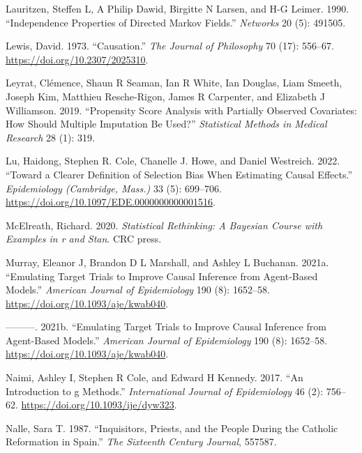 \documentclass[
  singlecolumn]{article}
\newlength{\cslhangindent}
\newlength{\cslentryspacingunit} %
\newenvironment{CSLReferences}[2] %
 {%
  \setlength{\parindent}{0pt}
  \ifodd #1
  \let\oldpar\par
  \def\par{\hangindent=\cslhangindent\oldpar}
  \fi
  \setlength{\parskip}{#2\cslentryspacingunit}
 }%
 {}
\begin{document}
\begin{CSLReferences}{1}{0}
\leavevmode{}%
Lauritzen, Steffen L, A Philip Dawid, Birgitte N Larsen, and H-G Leimer.
1990. {``Independence Properties of Directed Markov Fields.''}
\emph{Networks} 20 (5): 491505.

\leavevmode{}%
Lewis, David. 1973. {``Causation.''} \emph{The Journal of Philosophy} 70
(17): 556--67. \url{https://doi.org/10.2307/2025310}.

\leavevmode{}%
Leyrat, Clémence, Shaun R Seaman, Ian R White, Ian Douglas, Liam Smeeth,
Joseph Kim, Matthieu Resche-Rigon, James R Carpenter, and Elizabeth J
Williamson. 2019. {``Propensity Score Analysis with Partially Observed
Covariates: How Should Multiple Imputation Be Used?''} \emph{Statistical
Methods in Medical Research} 28 (1): 319.

\leavevmode{}%
Lu, Haidong, Stephen R. Cole, Chanelle J. Howe, and Daniel Westreich.
2022. {``Toward a Clearer Definition of Selection Bias When Estimating
Causal Effects.''} \emph{Epidemiology (Cambridge, Mass.)} 33 (5):
699--706. \url{https://doi.org/10.1097/EDE.0000000000001516}.

\leavevmode{}%
McElreath, Richard. 2020. \emph{Statistical Rethinking: A Bayesian
Course with Examples in r and Stan}. CRC press.

\leavevmode{}%
Murray, Eleanor J, Brandon D L Marshall, and Ashley L Buchanan. 2021a.
{``Emulating Target Trials to Improve Causal Inference from Agent-Based
Models.''} \emph{American Journal of Epidemiology} 190 (8): 1652--58.
\url{https://doi.org/10.1093/aje/kwab040}.

\leavevmode{}%
---------. 2021b. {``Emulating Target Trials to Improve Causal Inference
from Agent-Based Models.''} \emph{American Journal of Epidemiology} 190
(8): 1652--58. \url{https://doi.org/10.1093/aje/kwab040}.

\leavevmode{}%
Naimi, Ashley I, Stephen R Cole, and Edward H Kennedy. 2017. {``An
Introduction to g Methods.''} \emph{International Journal of
Epidemiology} 46 (2): 756--62. \url{https://doi.org/10.1093/ije/dyw323}.

\leavevmode{}%
Nalle, Sara T. 1987. {``Inquisitors, Priests, and the People During the
Catholic Reformation in Spain.''} \emph{The Sixteenth Century Journal},
557587.


\end{CSLReferences}
\end{document}
